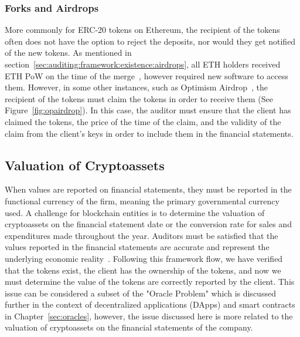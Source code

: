 \subsubsection{Forks and Airdrops}\label{sec:auditing:framework:ownership:airdrops}
More commonly for ERC-20 tokens on Ethereum, the recipient of the tokens often does not have the option to reject the deposits, nor would they get notified of the new tokens. As mentioned in section~\ref{sec:auditing:framework:existence:airdrops}, all ETH holders received ETH PoW on the time of the merge~\cite{themerge}, however required new software to access them. However, in some other instances, such as Optimism Airdrop~\cite{allen2023airdrop}, the recipient of the tokens must claim the tokens in order to receive them (See Figure~\ref{fig:opairdrop}). In this case, the auditor must ensure that the client has claimed the tokens, the price of the time of the claim, and the validity of the claim from the client's keys in order to include them in the financial statements.



\subsection{Valuation of Cryptoassets} \label{sec:auditing:framework:valuation}
When values are reported on financial statements, they must be reported in the functional currency of the firm, meaning the primary governmental currency used. A challenge for blockchain entities is to determine the valuation of cryptoassets on the financial statement date or the conversion rate for sales and expenditures made throughout the year. Auditors must be satisfied that the values reported in the financial statements are accurate and represent the underlying economic reality~\cite{eyvaluation}. Following this framework flow, we have verified that the tokens exist, the client has the ownership of the tokens, and now we must determine the value of the tokens are correctly reported by the client. This issue can be considered a subset of the "Oracle Problem" which is discussed further in the context of decentralized applications (DApps) and smart contracts in Chapter~\ref{sec:oracles}, however, the issue discussed here is more related to the valuation of cryptoassets on the financial statements of the company.


